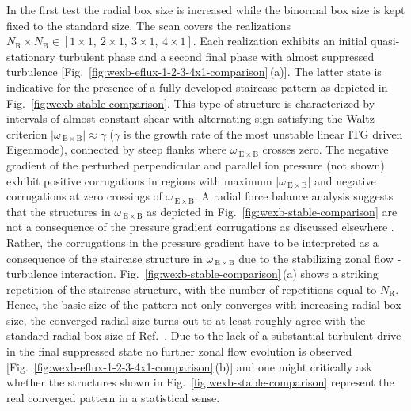 \documentclass[aip, amsmath, amssymb, reprint, twocolumn, floatfix]{revtex4-1}
\newcommand{\wexb}{\omega_{\mathrm{\:E \times B}}}
\newcommand{\NR}{N_\mathrm{R}}
\newcommand{\NB}{N_\mathrm{B}}
\begin{document}
In the first test the radial box size is increased while the binormal box size is kept fixed to the standard size. The scan covers the realizations $\NR\times\NB \in [ 1\times1,~2\times1,~3\times1,~4\times1]$.
Each realization exhibits an initial quasi-stationary turbulent phase and a second final \cite{Peeters2016} phase with almost suppressed turbulence [Fig.~\ref{fig:wexb-eflux-1-2-3-4x1-comparison}\,(a)].
The latter state is indicative for the presence of a fully developed staircase pattern as depicted in Fig.~\ref{fig:wexb-stable-comparison}. 
This type of structure is characterized by intervals of almost constant shear with alternating sign satisfying the Waltz criterion $|\wexb| \approx \gamma$\cite{Waltz1994, Waltz1998} ($\gamma$ is the growth rate of the most unstable linear ITG driven Eigenmode), connected by steep flanks where $\wexb$ crosses zero.
The negative gradient of the perturbed perpendicular and parallel ion pressure (not shown) exhibit positive corrugations in regions with maximum $|\wexb|$ and negative corrugations at zero crossings of $\wexb$. 
A radial force balance analysis suggests that the structures in $\wexb$ as depicted in Fig.~\ref{fig:wexb-stable-comparison} are not a consequence of the pressure gradient corrugations as discussed elsewhere \cite{hahm2018}.
Rather, the corrugations in the pressure gradient have to be interpreted as a consequence of the staircase structure in $\wexb$ due to the stabilizing zonal flow - turbulence interaction.
Fig.~\ref{fig:wexb-stable-comparison}\,(a) shows a striking repetition of the staircase structure, with the number of repetitions equal to $\NR$.
Hence, the basic size of the pattern not only converges with increasing radial box size, the converged radial size turns out to at least roughly agree with the standard radial box size of Ref.~.
Due to the lack of a substantial turbulent drive in the final suppressed state no further zonal flow evolution is observed [Fig.~\ref{fig:wexb-eflux-1-2-3-4x1-comparison}\,(b)] and one might critically ask whether the structures shown in Fig.~\ref{fig:wexb-stable-comparison} represent the real converged pattern in a statistical sense. 
\end{document}
